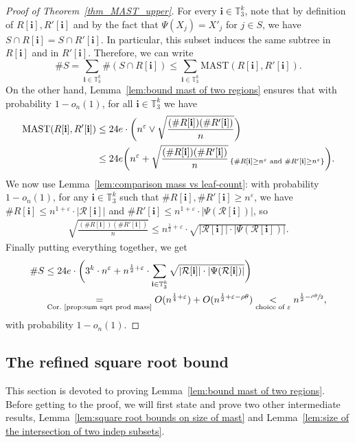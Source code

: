 \documentclass[11pt]{article}
\makeatletter
\DeclareRobustCommand{\mathbbm}[1]{\csname jepbb@#1\endcsname}
\newcommand{\indicator}[1]{\mathbbm{1}_{#1}}
\newcommand{\MAST}{\mathrm{MAST}}
\newcommand{\Rr}{\mathcal{R}}
\newcommand{\ii}{\mathbf{i}}
\let\eps\varepsilon
\theoremstyle{plain}
\theoremstyle{definition}
\numberwithin{equation}{section}
\makeatother
\begin{document}
\begin{proof}[Proof of Theorem~\ref{thm_MAST_upper}]
For every $\ii \in \mathbb{T}_3^k$, note that by definition of $R[\ii], R'[\ii]$ and by the fact that \hbox{$\Psi(X_j)=X'_j$} for $j \in S$, we have $S \cap R[\ii]=S \cap R'[\ii]$. In particular, this subset induces the same subtree in $R[\ii]$ and in $R'[\ii]$. Therefore, we can write\vspace*{-3pt}
\[ \# S = \sum_{\ii \in \mathbb{T}_3^k} \#(S \cap R[\ii]) \leq \sum_{\ii \in \mathbb{T}_3^k} \MAST \left( R[\ii], R'[\ii] \right). \]
On the other hand, Lemma~\ref{lem:bound mast of two regions} ensures that with probability $1-o_n(1)$, for all $\ii \in \mathbb{T}_3^k$ we have\vspace*{-3pt}
\begin{align*}
\mathrm{MAST}(R[\ii] ,R'[\ii])
&\leq 24e \cdot \biggl(n^\eps \vee \sqrt{\frac{(\#R[\ii] )(\#R'[\ii] )}{n}}\biggr)\\
&\leq 24e \biggl(n^\eps + \sqrt{\frac{(\#R[\ii] )(\#R'[\ii] )}{n}}\,\indicator{\{\#R[\ii] \geq n^\eps \text{ and } \#R'[\ii] \geq n^\eps\}} \biggr).
\end{align*}
We now use Lemma~\ref{lem:comparison mass vs leaf-count}: with probability $1-o_n(1)$, for any $\ii \in \mathbb{T}_3^k$ such that $\#R[\ii], \#R'[\ii] \geq n^{\eps}$, we have $\#R[\ii]\leq n^{1+\eps}\cdot|\Rr[\ii]|$ and $\#R'[\ii] \leq n^{1+\eps}\cdot|\Psi(\Rr[\ii])|$, so
\begin{align*}
\sqrt{\frac{(\#R[\ii] )(\#R'[\ii])}{n}} \leq n^{\frac{1}{2}+\eps} \cdot \sqrt{|\Rr[\ii] | \cdot |\Psi(\Rr[\ii] )|}.
\end{align*}
Finally putting everything together, we get\vspace*{-3pt}
\begin{align*}
\#S & \leq 24 e \cdot \biggl( 3^k\cdot n^\eps + n^{\frac{1}{2}+\eps}\cdot \sum_{\ii \in \mathbb{T}_3^k} \sqrt{|\Rr[\ii] | \cdot |\Psi(\Rr[\ii])|}\biggr)\\
&\underset{\text{Cor.~\ref{prop:sum sqrt prod mass}}}{=} O(n^{\frac{1}{4}+\eps}) + O(n^{\frac{1}{2}+\eps -\rho \theta})\underset{\text{choice of $\eps$}}{<} n^{\frac{1}{2}-\sfrac{\rho \theta}{2}},
\end{align*}
with probability $1-o_n(1)$.
\end{proof}
\subsection{The refined square root bound}
This section is devoted to proving Lem\-ma~\ref{lem:bound mast of two regions}.
Before getting to the proof, we will first state and prove two other intermediate results, Lemma~\ref{lem:square root bounds on size of mast} and Lemma~\ref{lem:size of the intersection of two indep subsets}.
\end{document}
